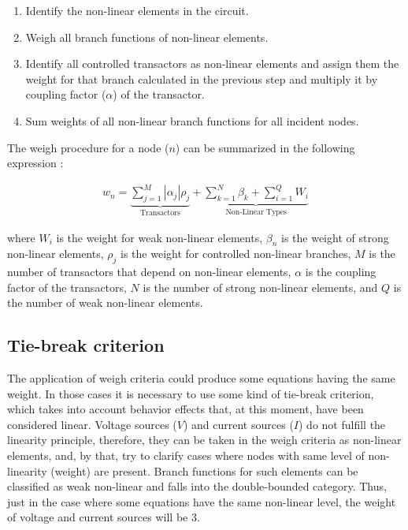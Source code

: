\documentclass[conference,letterpaper,onecolumn,11pt]{IEEEtran}
\begin{document}
\begin{enumerate}
\item Identify the non-linear elements in the circuit.
\item Weigh all branch functions of non-linear elements.
\item Identify all controlled transactors as non-linear elements and assign them the weight for that branch calculated in the previous step and multiply it by coupling factor ($\alpha$) of the transactor.
\item Sum weights of all non-linear branch functions for all incident nodes.
\end{enumerate}

The weigh procedure for a node ($n$) can be summarized in the following expression \cite{homo_ICECS,homo_SMACD}:

\begin{equation}
\begin{array}{l}
w_n=\underbrace{\sum _{j=1}^{M}{|\alpha_j|\rho_j}}_{\mbox{Transactors}} + \underbrace{\sum _{k=1}^{N}{\beta_k}+\sum _{i=1}^{Q}{W_i}}_{\mbox{Non-Linear Types}}
\end{array}
\end{equation}

where $W_i$ is the weight for weak non-linear elements, $\beta_n$ is the weight of strong non-linear elements, $\rho_j$ is the weight for controlled non-linear branches, $M$ is the number of transactors that depend on non-linear elements, $\alpha$ is the coupling factor of the transactors, $N$ is the number of strong non-linear elements, and $Q$ is the number of weak non-linear elements.

\subsection{Tie-break criterion}

The application of weigh criteria could produce some equations having the same weight. In those cases it is necessary to use some kind of tie-break criterion, which takes into account behavior effects that, at this moment, have been considered linear. Voltage sources ($V$) and current sources ($I$) do not fulfill the linearity principle, therefore, they can be taken in the weigh criteria as non-linear elements, and, by that, try to clarify cases where nodes with same level of non-linearity (weight) are present. Branch functions for such elements can be classified as weak non-linear and falls into the double-bounded category. Thus, just in the case where some equations have the same non-linear level, the weight of voltage and current sources will be 3.
\end{document}
